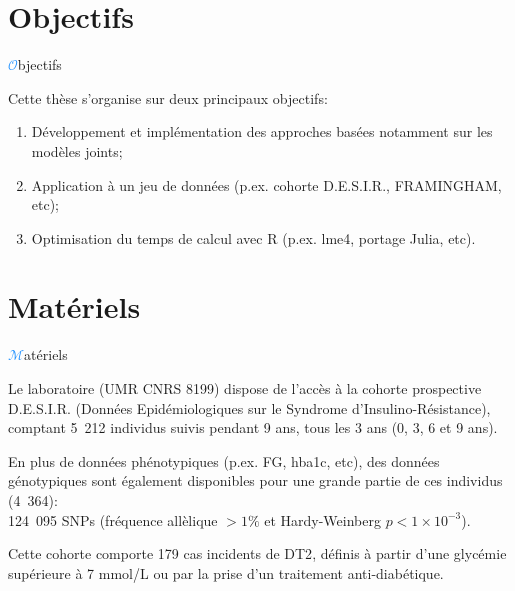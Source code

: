 \section{Objectifs}
\begin{frame}{{\huge\textcolor{dodgerblue}{$\mathcal{O}$}}bjectifs}
\par{Cette thèse s'organise sur deux principaux objectifs:
\begin{enumerate}
    \item Développement et implémentation des approches basées notamment sur les modèles joints;
    \item Application à un jeu de données (p.ex. cohorte \textcolor{springgreen3}{D.E.S.I.R.}, \textcolor{springgreen3}{FRAMINGHAM}, etc);
    \vspace{1em}
    \item Optimisation du temps de calcul avec \textcolor{springgreen3}{R} (p.ex. \textcolor{springgreen3}{lme4}, portage \textcolor{springgreen3}{Julia}, etc).
\end{enumerate}
}
\end{frame}

\section{Matériels}
\begin{frame}{{\huge\textcolor{dodgerblue}{$\mathcal{M}$}}atériels}{}
{\small
\par{Le laboratoire (\textcolor{springgreen3}{UMR CNRS 8199}) dispose de l'accès à la cohorte prospective \textcolor{springgreen3}{D.E.S.I.R.}
(\textcolor{springgreen3}{D}onnées \textcolor{springgreen3}{E}pidémiologiques sur le \textcolor{springgreen3}{S}yndrome d’\textcolor{springgreen3}{I}nsulino-\textcolor{springgreen3}{R}ésistance),
comptant \textcolor{springgreen3}{5~212} individus suivis pendant \textcolor{springgreen3}{9} ans, tous les
\textcolor{springgreen3}{3 ans} (\textcolor{springgreen3}{0}, \textcolor{springgreen3}{3}, \textcolor{springgreen3}{6}
et \textcolor{springgreen3}{9} ans).}
\vspace{1em}
\par{En plus de données phénotypiques (p.ex. \textcolor{springgreen3}{FG}, \textcolor{springgreen3}{hba1c}, etc), des données génotypiques sont également disponibles
pour une grande partie de ces individus (\textcolor{springgreen3}{4~364}): \\ \textcolor{springgreen3}{124~095 SNPs} (fréquence allèlique \textcolor{springgreen3}{$>1\%$} et Hardy-Weinberg \textcolor{springgreen3}{$p<1 \times 10^{-3}$}).}
\vspace{1em}
\par{Cette cohorte comporte \textcolor{springgreen3}{179} cas incidents de \textcolor{springgreen3}{DT2}, définis à partir
d'une glycémie supérieure à \textcolor{springgreen3}{7 mmol/L} ou par la prise d'un traitement anti-diabétique.}
}
\end{frame}


